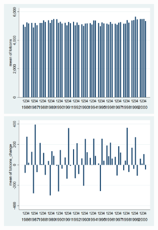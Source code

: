 \documentclass[12pt,a4paper]{article}
\begin{document}
\begin{center}
\includegraphics[width=8cm]{totcons_quarterly.png}
\includegraphics[width=8cm]{totcons_change_quarterly.png}\\
\end{center}
\end{document}
